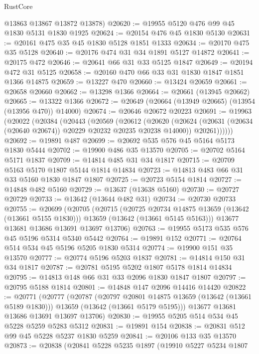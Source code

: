 \begin{lexlean}{RustCore}
\begin{coremodule}
      @13863
      @13867
      @13872
      @13878)
@20620 := @19955 @5120 @476 @99 @45 @1830 @5131 @1830 @1925
@20624 := @20154 @476 @45 @1830 @5130
@20631 := @20161 @475 @35 @45 @1830 @5128 @1851 @1333
@20634 := @20170 @475 @35 @5128
@20640 := @20176 @474 @31 @34 @1891 @5127 @14872
@20641 := @20175 @472
@20646 := @20641 @66 @31 @33 @5125 @1847
@20649 := @20194 @472 @31 @5125
@20658 := @20160 @470 @66 @33 @31 @1830 @1847 @1851 @1366 @14875
@20659 := @13227 @470
@20660 := @13424 @20659
@20661 := @20658 @20660
@20662 := @13298 @1366
@20664 := @20661 (@13945 @20662)
@20665 := @13322 @1366
@20672 := @20649 (@20664 (@13949 @20665) (@13954 (@13956 @470)) @14000)
@20674 := @20646 @20672 @20223
@20691 := @19963
    (@20022
      (@20384
        (@20443
          (@20569
            (@20612
              (@20620
                (@20624 (@20631 (@20634 (@20640 @20674)) @20229 @20232 @20235 @20238 @14000))
                @20261))))))
@20692 := @19891 @487
@20699 := @20692 @535 @576 @45 @5164 @5173 @1830 @5444
@20702 := @19900 @486 @35 @13570
@20705 := @20702 @5164 @5171 @1837
@20709 := @14814 @485 @31 @34 @1817
@20715 := @20709 @5163 @5170 @1807 @5144 @1814 @14834
@20723 := @14813 @483 @66 @31 @33 @5160 @1830 @1847 @1807
@20725 := @20723 @5154 @1814
@20727 := @14848 @482 @5160
@20729 := @13637 (@13638 @5160)
@20730 := @20727 @20729
@20733 := @13642 (@13644 @482 @31)
@20734 := @20730 @20733
@20755 := @20699
    (@20705
      (@20715
        (@20725 @20734 @14875 @13659 (@13642 (@13661 @5155 @1830)))
        @13659
        (@13642 (@13661 @5145 @5163)))
      @13677
      @13681
      @13686
      @13691
      @13697
      @13706)
@20763 := @19955 @5173 @535 @576 @45 @5196 @5314 @5340 @5442
@20764 := @19891 @152
@20771 := @20764 @514 @534 @45 @5196 @5205 @1830 @5314
@20774 := @19900 @151 @35 @13570
@20777 := @20774 @5196 @5203 @1837
@20781 := @14814 @150 @31 @34 @1817
@20787 := @20781 @5195 @5202 @1807 @5178 @1814 @14834
@20795 := @14813 @148 @66 @31 @33 @2096 @1830 @1847 @1807
@20797 := @20795 @5188 @1814
@20801 := @14848 @147 @2096 @14416 @14420
@20822 := @20771
    (@20777
      (@20787
        (@20797 @20801 @14875 @13659 (@13642 (@13661 @5189 @1830)))
        @13659
        (@13642 (@13661 @5179 @5195)))
      @13677
      @13681
      @13686
      @13691
      @13697
      @13706)
@20830 := @19955 @5205 @514 @534 @45 @5228 @5259 @5283 @5312
@20831 := @19891 @154
@20838 := @20831 @512 @99 @45 @5228 @5237 @1830 @5259
@20841 := @20106 @133 @35 @13570
@20873 := @20838
    (@20841
      @5228
      @5235
      @1897
      (@19910
        @5227
        @5234
        @1807

\end{coremodule}
\end{lexlean}
